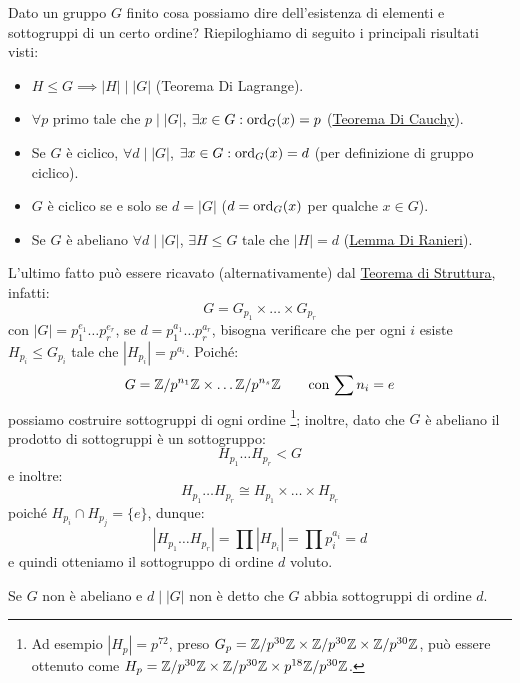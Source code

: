 \documentclass[11pt]{scrartcl}
\begin{document}
\begin{remark}
    Dato un gruppo $G$ finito cosa possiamo dire dell'esistenza di elementi e sottogruppi di un certo ordine? Riepiloghiamo di seguito i principali risultati visti:
        \begin{itemize}
            \item $H \leqslant G \implies |H| \mid |G|$ (Teorema Di Lagrange).
            \item $\forall p$ primo tale che $p \mid |G|$, $\exists x \in G : \operatorname{ord}_G(x) = p$ (\hyperref[p:Cauchy]{Teorema Di Cauchy}).
            \item Se $G$ è ciclico, $\forall d \mid |G|$, $\exists x \in G : \operatorname{ord}_G(x) = d$ (per definizione di gruppo ciclico).
            \item $G$ è ciclico se e solo se $d = |G|$ ($d = \operatorname{ord}_G(x)$ per qualche $x \in G$).
            \item Se $G$ è abeliano $\forall d \mid |G|$, $\exists H \leqslant G$ tale che $|H| = d$ (\hyperref[davide]{Lemma Di Ranieri}).
        \end{itemize}
\end{remark}
L'ultimo fatto può essere ricavato (alternativamente) dal \hyperref[t:struttura]{Teorema di Struttura}, infatti:
    \[ G = G_{p_1} \times \ldots \times G_{p_r}
        \]
con $|G| = p_1^{e_1}\ldots p_r^{e_r}$, se $d = p_1^{a_1}\ldots p_r^{a_r}$, bisogna verificare che per ogni $i$ esiste $H_{p_i} \leqslant G_{p_i}$ tale che $|H_{p_i}| = p^{a_i}$.
Poiché:
    \[ G = \mathbb{Z}/{p^{n_1}}\mathbb{Z} \times \ldots \mathbb{Z}/{p^{n_s}}\mathbb{Z} \qquad \text{con $\sum n_i = e$}
        \]
possiamo costruire sottogruppi di ogni ordine \footnote{Ad esempio $|H_p| = p^{72}$, preso $G_p = \mathbb{Z}/{p^{30}}\mathbb{Z} \times \mathbb{Z}/{p^{30}}\mathbb{Z} \times \mathbb{Z}/{p^{30}}\mathbb{Z}$, può essere ottenuto come $H_p = \mathbb{Z}/{p^{30}}\mathbb{Z} \times \mathbb{Z}/{p^{30}}\mathbb{Z} \times p^{18} \mathbb{Z}/{p^{30}}\mathbb{Z}$.};
inoltre, dato che $G$ è abeliano il prodotto di sottogruppi è un sottogruppo:
    \[ H_{p_1}\ldots H_{p_r} < G
        \]
e inoltre:
    \[ H_{p_1}\ldots H_{p_r} \cong H_{p_1} \times \ldots \times H_{p_r}
        \]
poiché $H_{p_i} \cap H_{p_j} = \{e\}$, dunque:
    \[ |H_{p_1}\ldots H_{p_r}| = \prod |H_{p_i}| = \prod p_{i}^{a_i} = d
        \]
e quindi otteniamo il sottogruppo di ordine $d$ voluto.
    
\begin{remark}
    Se $G$ non è abeliano e $d \mid |G|$ non è detto che $G$ abbia sottogruppi di ordine $d$.
\end{remark}
\end{document}
